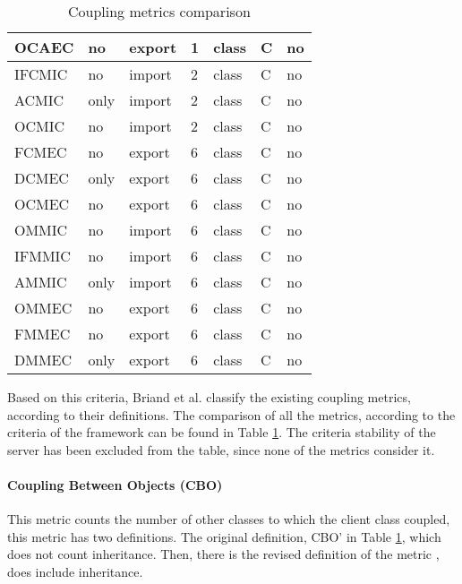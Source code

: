 \begin{table}[p]
\begin{center}
\begin{tabular}{|l|l|l|l|l|l|l|}
    OCAEC         & no    & export  & 1     & class               & C     & no      \\
    \hline
    IFCMIC        & no    & import  & 2     & class               & C     & no      \\
    ACMIC         & only  & import  & 2     & class               & C     & no      \\
    OCMIC         & no    & import  & 2     & class               & C     & no      \\
    FCMEC         & no    & export  & 6     & class               & C     & no      \\
    DCMEC         & only  & export  & 6     & class               & C     & no      \\
    OCMEC         & no    & export  & 6     & class               & C     & no      \\
    \hline
    OMMIC         & no    & import  & 6     & class               & C     & no      \\
    IFMMIC        & no    & import  & 6     & class               & C     & no      \\
    AMMIC         & only  & import  & 6     & class               & C     & no      \\
    OMMEC         & no    & export  & 6     & class               & C     & no      \\
    FMMEC         & no    & export  & 6     & class               & C     & no      \\
    DMMEC         & only  & export  & 6     & class               & C     & no      \\
    \hline
    \end{tabular}
    \end{center}
    \caption{Coupling metrics comparison}
    \label{table:coupling-metrics}
\end{table}


\blankl
Based on this criteria, Briand et al. classify the existing coupling metrics, according to their definitions. The comparison of all the metrics, according to the criteria of the framework can be found in Table \ref{table:coupling-metrics}. The criteria stability of the server has been excluded from the table, since none of the metrics consider it.

\paragraph{Coupling Between Objects (CBO)} This metric counts the number of other classes to which the client class coupled, this metric has two definitions. The original definition, CBO' in Table \ref{table:coupling-metrics}, which does not count inheritance. Then, there is the revised definition of the metric \cite{chidamber1994metrics}, does include inheritance.


